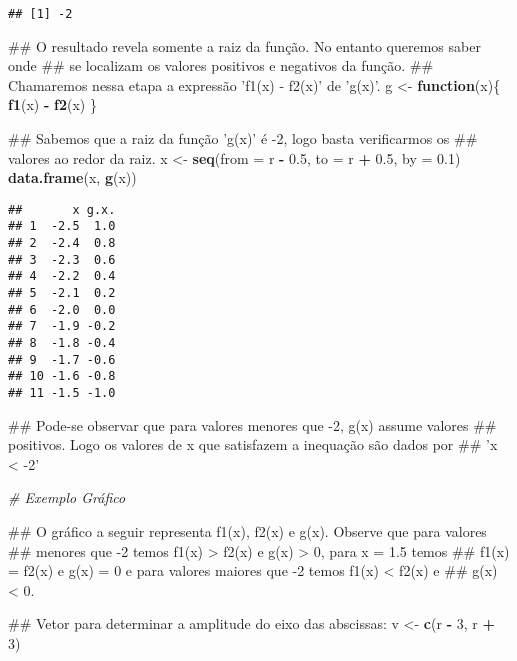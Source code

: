\documentclass[]{book}
\newenvironment{Shaded}{\begin{snugshade}}{\end{snugshade}}
\newcommand{\KeywordTok}[1]{\textcolor[rgb]{0.13,0.29,0.53}{\textbf{#1}}}
\newcommand{\DataTypeTok}[1]{\textcolor[rgb]{0.13,0.29,0.53}{#1}}
\newcommand{\DecValTok}[1]{\textcolor[rgb]{0.00,0.00,0.81}{#1}}
\newcommand{\FloatTok}[1]{\textcolor[rgb]{0.00,0.00,0.81}{#1}}
\newcommand{\StringTok}[1]{\textcolor[rgb]{0.31,0.60,0.02}{#1}}
\newcommand{\CommentTok}[1]{\textcolor[rgb]{0.56,0.35,0.01}{\textit{#1}}}
\newcommand{\ControlFlowTok}[1]{\textcolor[rgb]{0.13,0.29,0.53}{\textbf{#1}}}
\newcommand{\OperatorTok}[1]{\textcolor[rgb]{0.81,0.36,0.00}{\textbf{#1}}}
\newcommand{\NormalTok}[1]{#1}
\begin{document}
\begin{enumerate}
\begin{verbatim}
## [1] -2
\end{verbatim}

\begin{Shaded}
\begin{Highlighting}[]
\NormalTok{##  O resultado revela somente a raiz da função. No entanto queremos saber onde}
\NormalTok{## se localizam os valores positivos e negativos da função.}
\NormalTok{##  Chamaremos nessa etapa a expressão 'f1(x) - f2(x)' de 'g(x)'.}
\NormalTok{g <-}\StringTok{ }\ControlFlowTok{function}\NormalTok{(x)\{}
  \KeywordTok{f1}\NormalTok{(x) }\OperatorTok{-}\StringTok{ }\KeywordTok{f2}\NormalTok{(x)}
\NormalTok{\}}

\NormalTok{##  Sabemos que a raiz da função 'g(x)' é -2, logo basta verificarmos os}
\NormalTok{## valores ao redor da raiz.}
\NormalTok{x <-}\StringTok{ }\KeywordTok{seq}\NormalTok{(}\DataTypeTok{from =}\NormalTok{ r }\OperatorTok{-}\StringTok{ }\FloatTok{0.5}\NormalTok{, }\DataTypeTok{to =}\NormalTok{ r }\OperatorTok{+}\StringTok{ }\FloatTok{0.5}\NormalTok{, }\DataTypeTok{by =} \FloatTok{0.1}\NormalTok{)}
\KeywordTok{data.frame}\NormalTok{(x, }\KeywordTok{g}\NormalTok{(x))}
\end{Highlighting}
\end{Shaded}

\begin{verbatim}
##       x g.x.
## 1  -2.5  1.0
## 2  -2.4  0.8
## 3  -2.3  0.6
## 4  -2.2  0.4
## 5  -2.1  0.2
## 6  -2.0  0.0
## 7  -1.9 -0.2
## 8  -1.8 -0.4
## 9  -1.7 -0.6
## 10 -1.6 -0.8
## 11 -1.5 -1.0
\end{verbatim}

\begin{Shaded}
\begin{Highlighting}[]
\NormalTok{##  Pode-se observar que para valores menores que -2, g(x) assume valores}
\NormalTok{## positivos. Logo os valores de x que satisfazem a inequação são dados por}
\NormalTok{## 'x < -2'}

\CommentTok{# Exemplo Gráfico}

\NormalTok{##  O gráfico a seguir representa f1(x), f2(x) e g(x). Observe que para valores}
\NormalTok{## menores que -2 temos f1(x) > f2(x) e g(x) > 0, para x = 1.5 temos }
\NormalTok{## f1(x) = f2(x) e g(x) = 0 e para valores maiores que -2 temos f1(x) < f2(x) e}
\NormalTok{## g(x) < 0.}

\NormalTok{##  Vetor para determinar a amplitude do eixo das abscissas:}
\NormalTok{v <-}\StringTok{ }\KeywordTok{c}\NormalTok{(r }\OperatorTok{-}\StringTok{ }\DecValTok{3}\NormalTok{, r }\OperatorTok{+}\StringTok{ }\DecValTok{3}\NormalTok{)}


\end{Highlighting}
\end{Shaded}
\end{enumerate}
\end{document}
